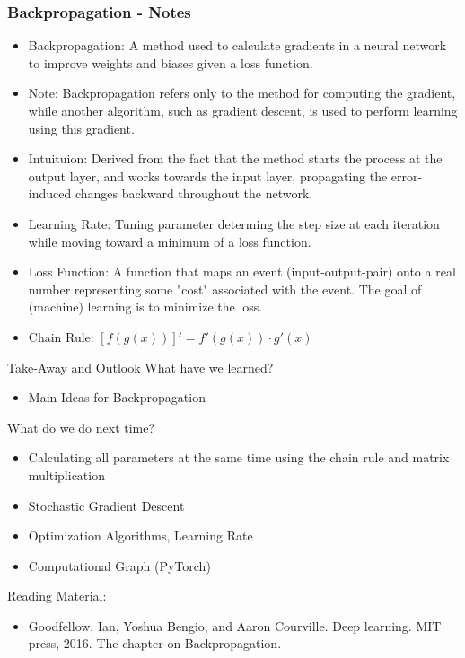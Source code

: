 \documentclass[aspectratio=169]{beamer}
\begin{document}
\begin{frame}\frametitle{Backpropagation - Notes}
\begin{itemize}
    \item Backpropagation: A method used to calculate gradients in a neural network to improve weights and biases given a loss function. 
    \item Note: Backpropagation refers only to the method for computing the gradient, while another algorithm, such as gradient descent, is used to perform learning using this gradient.
    \item Intuituion: Derived from the fact that the method starts the process at the output layer, and works towards the input layer, propagating the error-induced changes backward throughout the network. 
    \item Learning Rate: Tuning parameter determing the step size at each iteration while moving toward a minimum of a loss function.
    \item Loss Function: A function that maps an event (input-output-pair) onto a real number representing some "cost" associated with the event. The goal of (machine) learning is to minimize the loss.
    \item Chain Rule: $\displaystyle [f(g(x))]'=f'(g(x))\cdot g'(x)$
\end{itemize}
\end{frame}

\begin{frame}{Take-Away and Outlook} 
What have we learned?
\begin{itemize}
    \item Main Ideas for Backpropagation
\end{itemize}
What do we do next time?
\begin{itemize}
    \item Calculating all parameters at the same time using the chain rule and matrix multiplication
    \item Stochastic Gradient Descent %
    \item Optimization Algorithms, Learning Rate
    \item Computational Graph (PyTorch)
\end{itemize}
Reading Material:
\begin{itemize}
    \item Goodfellow, Ian, Yoshua Bengio, and Aaron Courville. Deep learning. MIT press, 2016. The chapter on Backpropagation.
\end{itemize}
\end{frame}
\end{document}
